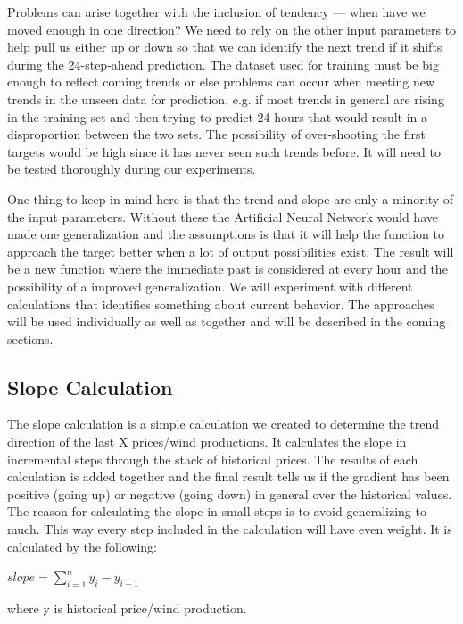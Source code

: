 Problems can arise together with the inclusion of tendency --- when have we moved enough in one direction? We need to rely on the other input parameters to help pull us either up or down so that we can identify the next trend if it shifts during the 24-step-ahead prediction. The dataset used for training must be big enough to reflect coming trends or else problems can occur when meeting new trends in the unseen data for prediction, e.g. if most trends in general are rising in the training set and then trying to predict 24 hours that would result in a disproportion between the two sets. The possibility of over-shooting the first targets would be high since it has never seen such trends before. It will need to be tested thoroughly during our experiments. 

One thing to keep in mind here is that the trend and slope are only a minority of the input parameters. Without these the Artificial Neural Network would have made one generalization and the assumptions is that it will help the function to approach the target better when a lot of output possibilities exist. The result will be a new function where the immediate past is considered at every hour and the possibility of a improved generalization. We will experiment with different calculations that identifies something about current behavior. The approaches will be used individually as well as together and will be described in the coming sections.

\subsection{Slope Calculation}
\label{sec:curveAnalysis}
The slope calculation is a simple calculation we created to determine the trend direction of the last X prices/wind productions. It calculates the slope in incremental steps through the stack of historical prices. The results of each calculation is added together and the final result tells us if the gradient has been positive (going up) or negative (going down) in general over the historical values. The reason for calculating the slope in small steps is to avoid generalizing to much. This way every step included in the calculation will have even weight. It is calculated by the following:
\begin{center}
$slope = \sum_{i=1}^{n} y_i - y_{i-1}$
\end{center}
\noindent where y is historical price/wind production.

